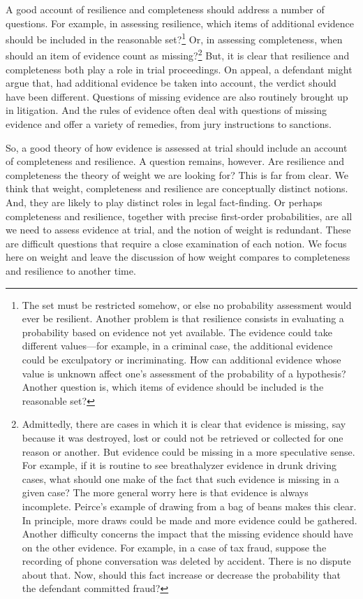 \documentclass[
  10pt,
  dvipsnames,enabledeprecatedfontcommands]{scrartcl}
\begin{document}
A good account of resilience and completeness should address a number of
questions. For example, in assessing resilience, which items of
additional evidence should be included in the reasonable set?\footnote{The
  set must be restricted somehow, or else no probability assessment
  would ever be resilient. Another problem is that resilience consists
  in evaluating a probability based on evidence not yet available. The
  evidence could take different values---for example, in a criminal
  case, the additional evidence could be exculpatory or incriminating.
  How can additional evidence whose value is unknown affect one's
  assessment of the probability of a hypothesis? Another question is,
  which items of evidence should be included is the reasonable set?} Or,
in assessing completeness, when should an item of evidence count as
missing?\footnote{Admittedly, there are cases in which it is clear that
  evidence is missing, say because it was destroyed, lost or could not
  be retrieved or collected for one reason or another. But evidence
  could be missing in a more speculative sense. For example, if it is
  routine to see breathalyzer evidence in drunk driving cases, what
  should one make of the fact that such evidence is missing in a given
  case? The more general worry here is that evidence is always
  incomplete. Peirce's example of drawing from a bag of beans makes this
  clear. In principle, more draws could be made and more evidence could
  be gathered. Another difficulty concerns the impact that the missing
  evidence should have on the other evidence. For example, in a case of
  tax fraud, suppose the recording of phone conversation was deleted by
  accident. There is no dispute about that. Now, should this fact
  increase or decrease the probability that the defendant committed
  fraud?} But, it is clear that resilience and completeness both play a
role in trial proceedings. On appeal, a defendant might argue that, had
additional evidence be taken into account, the verdict should have been
different. Questions of missing evidence are also routinely brought up
in litigation. And the rules of evidence often deal with questions of
missing evidence and offer a variety of remedies, from jury instructions
to sanctions.

So, a good theory of how evidence is assessed at trial should include an
account of completeness and resilience. A question remains, however. Are
resilience and completeness the theory of weight we are looking for?
This is far from clear. We think that weight, completeness and
resilience are conceptually distinct notions. And, they are likely to
play distinct roles in legal fact-finding. Or perhaps completeness and
resilience, together with precise first-order probabilities, are all we
need to assess evidence at trial, and the notion of weight is redundant.
These are difficult questions that require a close examination of each
notion. We focus here on weight and leave the discussion of how weight
compares to completeness and resilience to another time.
\end{document}
